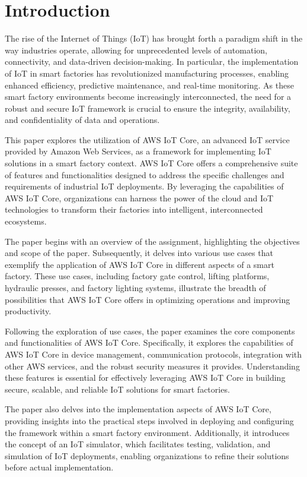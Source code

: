 \chapter{Introduction}

The rise of the Internet of Things (IoT) has brought forth a paradigm shift in the way industries operate, allowing for unprecedented levels of automation, connectivity, and data-driven decision-making. In particular, the implementation of IoT in smart factories has revolutionized manufacturing processes, enabling enhanced efficiency, predictive maintenance, and real-time monitoring. As these smart factory environments become increasingly interconnected, the need for a robust and secure IoT framework is crucial to ensure the integrity, availability, and confidentiality of data and operations.

This paper explores the utilization of AWS IoT Core, an advanced IoT service provided by Amazon Web Services, as a framework for implementing IoT solutions in a smart factory context. AWS IoT Core offers a comprehensive suite of features and functionalities designed to address the specific challenges and requirements of industrial IoT deployments. By leveraging the capabilities of AWS IoT Core, organizations can harness the power of the cloud and IoT technologies to transform their factories into intelligent, interconnected ecosystems.

The paper begins with an overview of the assignment, highlighting the objectives and scope of the paper. Subsequently, it delves into various use cases that exemplify the application of AWS IoT Core in different aspects of a smart factory. These use cases, including factory gate control, lifting platforms, hydraulic presses, and factory lighting systems, illustrate the breadth of possibilities that AWS IoT Core offers in optimizing operations and improving productivity.

Following the exploration of use cases, the paper examines the core components and functionalities of AWS IoT Core. Specifically, it explores the capabilities of AWS IoT Core in device management, communication protocols, integration with other AWS services, and the robust security measures it provides. Understanding these features is essential for effectively leveraging AWS IoT Core in building secure, scalable, and reliable IoT solutions for smart factories.

The paper also delves into the implementation aspects of AWS IoT Core, providing insights into the practical steps involved in deploying and configuring the framework within a smart factory environment. Additionally, it introduces the concept of an IoT simulator, which facilitates testing, validation, and simulation of IoT deployments, enabling organizations to refine their solutions before actual implementation.

